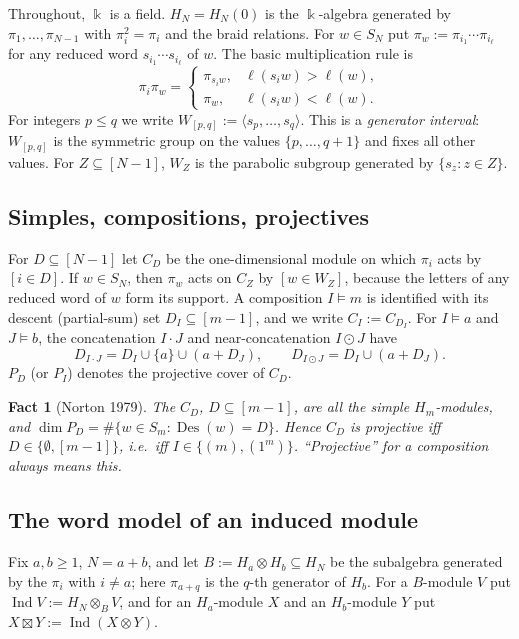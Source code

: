 \documentclass[11pt]{amsart}
\newcommand{\Ind}{\operatorname{Ind}}
\newcommand{\Des}{\operatorname{Des}}
\newcommand{\kk}{\Bbbk}
\newcommand{\sq}{\boxtimes}
\theoremstyle{plain}
\newtheorem{fact}[lemma]{Fact}
\theoremstyle{definition}
\begin{document}
Throughout, $\kk$ is a field. $H_N=H_N(0)$ is the $\kk$-algebra generated by $\pi_1,\dots,\pi_{N-1}$ with $\pi_i^2=\pi_i$ and the braid relations. For $w\in S_N$ put $\pi_w:=\pi_{i_1}\cdots\pi_{i_\ell}$ for any reduced word $s_{i_1}\cdots s_{i_\ell}$ of $w$. The basic multiplication rule is
\begin{equation}\label{eq:mult}
\pi_i\pi_w=\begin{cases}\pi_{s_iw}, & \ell(s_iw)>\ell(w),\\ \pi_w, & \ell(s_iw)<\ell(w).\end{cases}
\end{equation}
For integers $p\le q$ we write $W_{[p,q]}:=\langle s_p,\dots,s_q\rangle$. This is a \emph{generator interval}: $W_{[p,q]}$ is the symmetric group on the values $\{p,\dots,q+1\}$ and fixes all other values. For $Z\subseteq[N-1]$, $W_Z$ is the parabolic subgroup generated by $\{s_z:z\in Z\}$.

\subsection{Simples, compositions, projectives}
For $D\subseteq[N-1]$ let $C_D$ be the one-dimensional module on which $\pi_i$ acts by $[i\in D]$. If $w\in S_N$, then $\pi_w$ acts on $C_Z$ by $[w\in W_Z]$, because the letters of any reduced word of $w$ form its support. A composition $I\vDash m$ is identified with its descent (partial-sum) set $D_I\subseteq[m-1]$, and we write $C_I:=C_{D_I}$. For $I\vDash a$ and $J\vDash b$, the concatenation $I\cdot J$ and near-concatenation $I\odot J$ have
\[
D_{I\cdot J}=D_I\cup\{a\}\cup(a+D_J),\qquad D_{I\odot J}=D_I\cup(a+D_J).
\]
$P_D$ (or $P_I$) denotes the projective cover of $C_D$.

\begin{fact}[Norton 1979]\label{fact:N}
The $C_D$, $D\subseteq[m-1]$, are all the simple $H_m$-modules, and $\dim P_D=\#\{w\in S_m:\Des(w)=D\}$. Hence $C_D$ is projective iff $D\in\{\emptyset,[m-1]\}$, i.e.\ iff $I\in\{(m),(1^m)\}$. ``Projective'' for a composition always means this.
\end{fact}

\subsection{The word model of an induced module}
Fix $a,b\ge1$, $N=a+b$, and let $B:=H_a\otimes H_b\subseteq H_N$ be the subalgebra generated by the $\pi_i$ with $i\ne a$; here $\pi_{a+q}$ is the $q$-th generator of $H_b$. For a $B$-module $V$ put $\Ind V:=H_N\otimes_B V$, and for an $H_a$-module $X$ and an $H_b$-module $Y$ put $X\sq Y:=\Ind(X\otimes Y)$.
\end{document}
